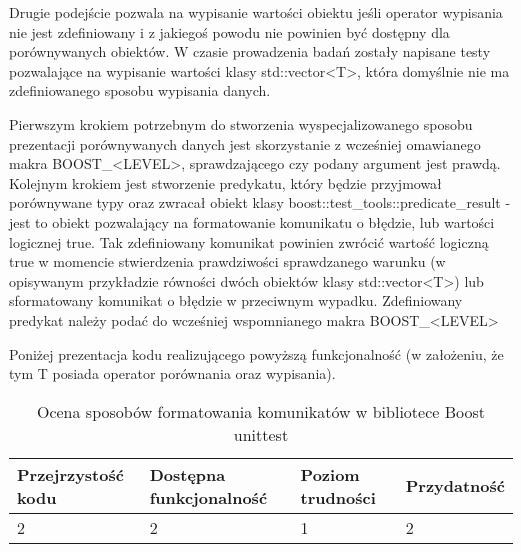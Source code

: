 \documentclass[12pt,a4paper,notitlepage]{report}
\begin{document}
Drugie podejście pozwala na wypisanie wartości obiektu jeśli operator wypisania nie jest zdefiniowany i z jakiegoś powodu nie powinien być dostępny dla porównywanych obiektów.
W czasie prowadzenia badań zostały napisane testy pozwalające na wypisanie wartości klasy std::vector<T>, która domyślnie nie ma zdefiniowanego sposobu wypisania danych.

Pierwszym krokiem potrzebnym do stworzenia wyspecjalizowanego sposobu prezentacji porównywanych danych jest skorzystanie z wcześniej omawianego makra BOOST{\_}<LEVEL>, sprawdzającego czy podany argument jest prawdą. Kolejnym krokiem jest stworzenie predykatu, który będzie przyjmował porównywane typy oraz zwracał obiekt klasy boost::test{\_}tools::predicate{\_}result - jest to obiekt pozwalający na formatowanie komunikatu o błędzie, lub wartości logicznej true.
Tak zdefiniowany komunikat powinien zwrócić wartość logiczną true w momencie stwierdzenia prawdziwości sprawdzanego warunku (w opisywanym przykładzie równości dwóch obiektów klasy std::vector<T>) lub sformatowany komunikat o błędzie w przeciwnym wypadku.
Zdefiniowany predykat należy podać do wcześniej wspomnianego makra BOOST{\_}<LEVEL>

Poniżej prezentacja kodu realizującego powyższą funkcjonalność (w założeniu, że tym T posiada operator porównania oraz wypisania).

			

\begin{center}
			\begin{table}[!ht]
			\caption{Ocena sposobów formatowania komunikatów w bibliotece Boost unittest}
			\label{}
			\begin{tabular}[!hc]{|l|l|l|l|}
		\hline
		Przejrzystość kodu 	&	Dostępna funkcjonalność	&	Poziom trudności	&	Przydatność \\ \hline
		2					&	2						&	1					& 	2  			\\ \hline
			\end{tabular}
			\end{table} 
		\end{center}
\end{document}
